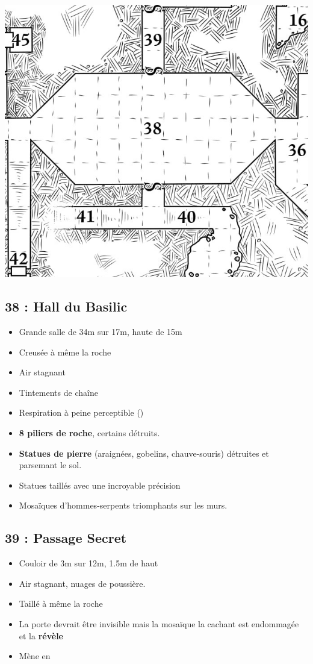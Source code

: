 \vfill

\pagebreak

\includegraphics[width=\columnwidth]{pics/map_38-42.jpg}

\subsection{38 : Hall du Basilic}\label{n3:s38}
\begin{itemize}
  \item Grande salle de 34m sur 17m, haute de 15m
  \item Creusée à même la roche
  \item Air stagnant
  \item Tintements de chaîne
  \item Respiration à peine perceptible (\textbf{})
  \item \textbf{8 piliers de roche}, certains détruits.
  \item \textbf{Statues de pierre} (araignées, gobelins, chauve-souris) détruites et parsemant le sol.
  \item Statues taillés avec une incroyable précision
  \item Mosaïques d'hommes-serpents triomphants sur les murs.
\end{itemize}

\subsection{39 : Passage Secret}\label{n3:s39}
\begin{itemize}
  \item Couloir de 3m sur 12m, 1.5m de haut
  \item Air stagnant, nuages de poussière.
  \item Taillé  à même la roche
  \item La porte devrait être invisible mais la mosaïque la cachant est endommagée et la \textbf{révèle}
  \item Mène en \textbf{}
\end{itemize}


